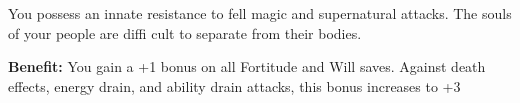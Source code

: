 
You possess an innate resistance to fell magic and supernatural attacks. The souls of your people are diffi cult to separate from their bodies.

\textbf{Benefit:} You gain a +1 bonus on all Fortitude and Will saves. Against death effects, energy drain, and ability drain attacks, this bonus increases to +3